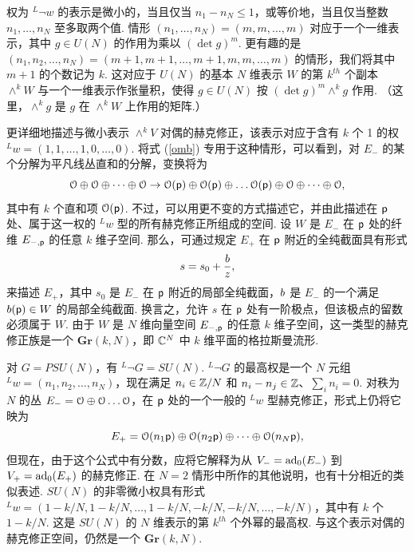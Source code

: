 权为 $^L\neg w$ 的表示是微小的，当且仅当 $n_1-n_N\leq 1$，或等价地，当且仅当整数 $n_1,\dots,n_N$ 至多取两个值.
情形 $(n_1,\dots,n_N)=(m,m,\dots,m)$ 对应于一个一维表示，其中 $g\in U(N)$ 的作用为乘以 $(\det g)^m$.
更有趣的是 $(n_1,n_2,\dots,n_N)=(m+1,m+1,\dots,m+1,m,m,\dots,m)$ 的情形，我们将其中 $m+1$ 的个数记为 $k$.
这对应于 $U(N)$ 的基本 $N$ 维表示 $W$ 的第 $k^{th}$ 个副本 $\wedge ^k W$ 与一个一维表示作张量积，使得 $g\in U(N)$ 按 $(\det g)^m\wedge^kg$ 作用.
（这里，$\wedge^kg$ 是 $g$ 在 $\wedge^kW$ 上作用的矩阵.）

更详细地描述与微小表示 $\wedge^kV$ 对偶的赫克修正，该表示对应于含有 $k$ 个 1 的权 $^Lw=(1,1,\dots,1,0,\dots,0)$.
将式 (\ref{omb}) 专用于这种情形，可以看到，对 $E_-$ 的某个分解为平凡线丛直和的分解，变换将为
\begin{equation}\label{gelfix} {\mathcal O}\oplus {\mathcal O} \oplus \dots\oplus {\mathcal O} \to{ {\mathcal O}({\sf p})\oplus {\mathcal O}({\sf p})\oplus \dots{\mathcal O}({\sf p})}\oplus {\mathcal O}\oplus \dots\oplus{\mathcal O}, \end{equation}
其中有 $k$ 个直和项 ${\mathcal O}({\sf p})$.
不过，可以用更不变的方式描述它，并由此描述在 ${\sf p}$ 处、属于这一权的 $^Lw$ 型的所有赫克修正所组成的空间.
设 $W$ 是 $E_-$ 在 ${\sf p}$ 处的纤维 $E_{-,{\sf p}}$ 的任意 $k$ 维子空间.
那么，可通过规定 $E_+$ 在 ${\sf p}$ 附近的全纯截面具有形式
\begin{equation}\label{durfy}s= s_0+\frac{b}{z} ,\end{equation}
来描述 $E_+$，其中 $s_0$ 是 $E_-$ 在 ${\sf p}$ 附近的局部全纯截面，$b$ 是 $E_-$ 的一个满足 $b({\sf p})\in W$ 的局部全纯截面.
换言之，允许 $s$ 在 ${\sf p}$ 处有一阶极点，但该极点的留数必须属于 $W$.
由于 $W$ 是 $N$ 维向量空间 $E_{-,{\sf p}}$ 的任意 $k$ 维子空间，这一类型的赫克修正族是一个 $\mathbf{Gr}(k,N)$，即 ${\mathbb C}^N$ 中 $k$ 维平面的格拉斯曼流形.

对 $G=PSU(N)$，有 $^L\neg G=SU(N)$.
$^L\neg G$ 的最高权是一个 $N$ 元组 $^Lw=(n_1,n_2,\dots, n_N)$，现在满足 $n_i\in{\mathbb Z}/N$ 和 $n_i-n_j\in{\mathbb Z}$、$\sum_i n_i=0$.
对秩为 $N$ 的丛 $E_-={\mathcal O}\oplus{\mathcal O}\dots{\mathcal O}$，在 ${\sf p}$ 处的一个一般的 $^Lw$ 型赫克修正，形式上仍将它映为
\begin{equation}\label{zombo}E_+={\mathcal O}(n_1{\sf p})\oplus {\mathcal O}(n_2{\sf p})\oplus\dots\oplus {\mathcal O}(n_N{\sf p}), \end{equation}
但现在，由于这个公式中有分数，应将它解释为从 $V_-={\rm ad}_0(E_-)$ 到 $V_+={\rm ad}_0(E_+)$ 的赫克修正.
在 $N=2$ 情形中所作的其他说明，也有十分相近的类似表述.
$SU(N)$ 的非零微小权具有形式 $^Lw=(1-k/N,1-k/N,\dots,1-k/N,-k/N,-k/N,\dots,-k/N)$，其中有 $k$ 个 $1-k/N$.
这是 $SU(N)$ 的 $N$ 维表示的第 $k^{th}$ 个外幂的最高权.
与这个表示对偶的赫克修正空间，仍然是一个 $\mathbf{Gr}(k,N)$.

